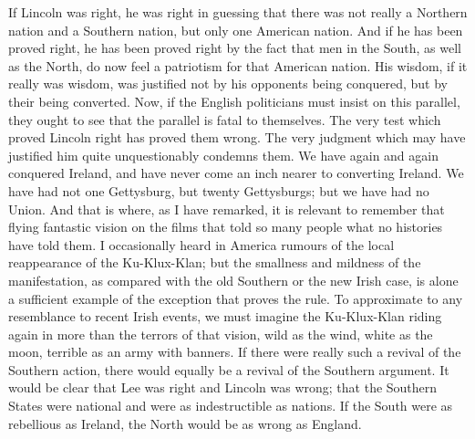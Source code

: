 \documentclass{book}
\begin{document}
If Lincoln was right, he was right in guessing that there was not really a Northern nation and a Southern nation, but only one American nation. And if he has been proved right, he has been proved right by the fact that men in the South, as well as the North, do now feel a patriotism for that American nation. His wisdom, if it really was wisdom, was justified not by his opponents being conquered, but by their being converted. Now, if the English politicians must insist on this parallel, they ought to see that the parallel is fatal to themselves. The very test which proved Lincoln right has proved them wrong. The very judgment which may have justified him quite unquestionably condemns them. We have again and again conquered Ireland, and have never come an inch nearer to converting Ireland. We have had not one Gettysburg, but twenty Gettysburgs; but we have had no Union. And that is where, as I have remarked, it is relevant to remember that flying fantastic vision on the films that told so many people what no histories have told them. I occasionally heard in America rumours of the local reappearance of the Ku-Klux-Klan; but the smallness and mildness of the manifestation, as compared with the old Southern or the new Irish case, is alone a sufficient example of the exception that proves the rule. To approximate to any resemblance to recent Irish events, we must imagine the Ku-Klux-Klan riding again in more than the terrors of that vision, wild as the wind, white as the moon, terrible as an army with banners. If there were really such a revival of the Southern action, there would equally be a revival of the Southern argument. It would be clear that Lee was right and Lincoln was wrong; that the Southern States were national and were as indestructible as nations. If the South were as rebellious as Ireland, the North would be as wrong as England.
\end{document}
